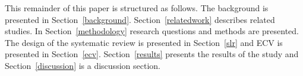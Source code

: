 This remainder of this paper is structured as follows. 
The background is presented in Section~\ref{background}.
Section~\ref{relatedwork} describes related studies.
In Section~\ref{methodology} research questions	and methods are presented.
The design of the systematic review is presented in Section~\ref{slr} and ECV is presented in Section~\ref{ecv}.
Section~\ref{results} presents the results of the study and Section~\ref{discussion} is a discussion section.